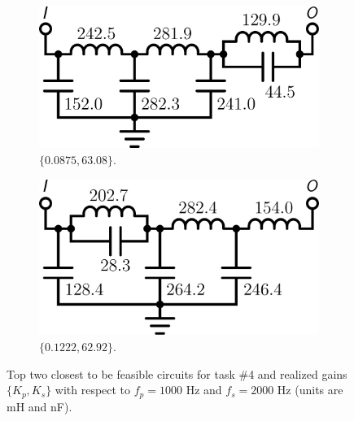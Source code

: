 \begin{figure}
\centering
\begin{subfigure}[t]{0.3\textwidth}
\centering
\includegraphics[scale = 0.14]{../ch6/figures/lpf4_circuit1}
\caption{$\{0.0875, 63.08\}$.\label{fig:lpf4_circuita}}
\end{subfigure}%
\begin{subfigure}[t]{0.3\textwidth}
\centering
\includegraphics[scale = 0.14]{../ch6/figures/lpf4_circuit2}
\caption{$\{0.1222, 62.92\}$.\label{fig:lpf4_circuitb}}
\end{subfigure}%

\caption[Top two closest to be feasible circuits for  task \#4.]{Top two closest to be feasible circuits for  task \#4 and realized gains $\{K_p,K_s\}$ with respect to $f_p=1000$ Hz and $f_s=2000$ Hz (units are mH and nF).\label{fig:lpf4}}

\end{figure}